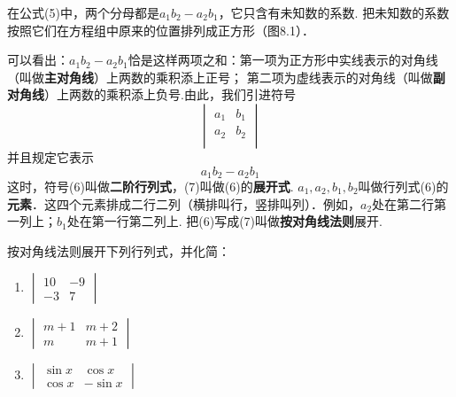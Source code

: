 在公式(5)中，两个分母都是$a_1b_2-a_2b_1$，它只含有未知数的系数. 把未知数的系数按照它们在方程组中原来的位置排列成正方形（图8.1）．
\begin{figure}[htp]
  \centering
{}
  \caption{}
\end{figure}

可以看出：$a_1b_2-a_2b_1$恰是这样两项之和：第一项为正方形中实线表示的对角线（叫做\textbf{主对角线}）上两数的乘积添上正号；
第二项为虚线表示的对角线（叫做\textbf{副对角线}）上两数的乘积添上负号.由此，我们引进符号
\begin{equation}
  \begin{vmatrix}
    a_1&b_1\\
    a_2&b_2\\
  \end{vmatrix}\tag{6}
\end{equation}
并且规定它表示
\begin{equation}
  a_1b_2-a_2b_1\tag{7}
\end{equation} 
这时，符号(6)叫做\textbf{二阶行列式}，(7)叫做(6)的\textbf{展开式}. $a_1,a_2,b_1,b_2$叫做行列式(6)的\textbf{元素}．这四个元素排成二行二列（横排叫行，竖排叫列）．例如，$a_2$处在第二行第一列上；$b_1$处在第一行第二列上. 把(6)写成(7)叫做\textbf{按对角线法则}展开.

\begin{example}
  按对角线法则展开下列行列式，并化简：
\begin{multicols}{3}
\begin{enumerate}[(1)]
  \item $\begin{vmatrix}
    10&-9\\ -3&7
  \end{vmatrix}$
  \item $\begin{vmatrix}
    m+1& m+2\\ m & m+1
  \end{vmatrix}$
  \item $\begin{vmatrix}
    \sin x& \cos x\\ \cos x& -\sin x
  \end{vmatrix}$
\end{enumerate}
\end{multicols}
\end{example}

